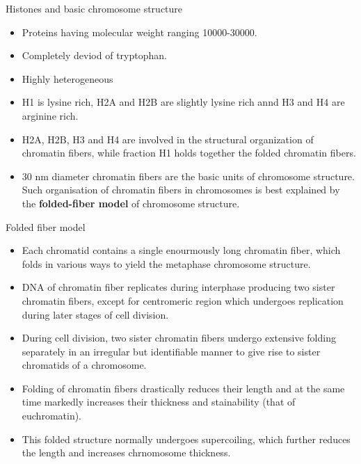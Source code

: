 \documentclass[11pt,dvipsnames,ignorenonframetext,aspectratio=169]{beamer}
\providecommand{\tightlist}{%
  \setlength{\itemsep}{0pt}\setlength{\parskip}{0pt}}
\begin{document}
\begin{frame}{Histones and basic chromosome structure}
\protect\hypertarget{histones-and-basic-chromosome-structure}{}
\begin{itemize}
\tightlist
\item
  Proteins having molecular weight ranging 10000-30000.
\item
  Completely deviod of tryptophan.
\item
  Highly heterogeneous
\item
  H1 is lysine rich, H2A and H2B are slightly lysine rich annd H3 and H4
  are arginine rich.
\item
  H2A, H2B, H3 and H4 are involved in the structural organization of
  chromatin fibers, while fraction H1 holds together the folded
  chromatin fibers.
\item
  30 nm diameter chromatin fibers are the basic units of chromosome
  structure. Such organisation of chromatin fibers in chromosomes is
  best explained by the \textbf{folded-fiber model} of chromosome
  structure.
\end{itemize}
\end{frame}

\begin{frame}{Folded fiber model}
\protect\hypertarget{folded-fiber-model}{}
\begin{itemize}
\tightlist
\item
  Each chromatid contains a single enourmously long chromatin fiber,
  which folds in various ways to yield the metaphase chromosome
  structure.
\item
  DNA of chromatin fiber replicates during interphase producing two
  sister chromatin fibers, except for centromeric region which undergoes
  replication during later stages of cell division.
\item
  During cell division, two sister chromatin fibers undergo extensive
  folding separately in an irregular but identifiable manner to give
  rise to sister chromatids of a chromosome.
\item
  Folding of chromatin fibers drastically reduces their length and at
  the same time markedly increases their thickness and stainability
  (that of euchromatin).
\item
  This folded structure normally undergoes supercoiling, which further
  reduces the length and increases chrnomosome thickness.
\end{itemize}
\end{frame}
\end{document}
